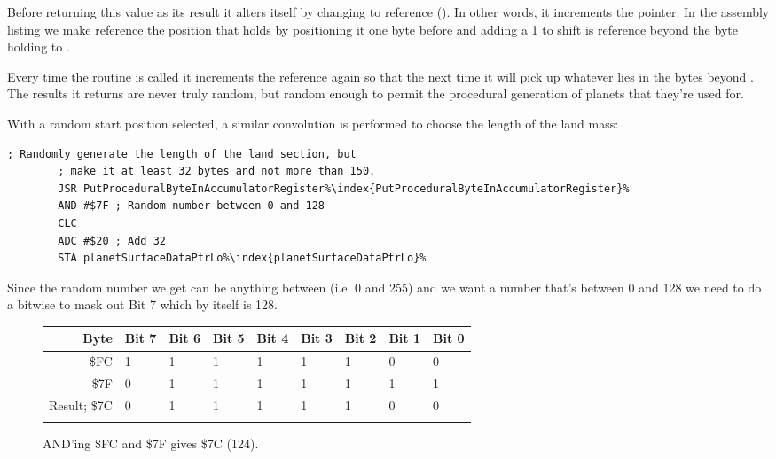 \begin{definition}
Before returning this value as its result it alters itself by changing
 to reference  (). In other words, it increments the pointer. In the
assembly listing we make  reference the position
that holds  by positioning it one byte before and
adding a 1 to shift is reference beyond the byte holding  to
.

Every time the routine is called it increments the reference again so that the next time it will pick up whatever
  lies in the bytes beyond . The results it returns are never truly random, but random enough
  to permit the procedural generation of planets that they're used for.

\end{definition}

With a random start position selected, a similar convolution is performed to choose the length of the land mass:

\begin{lstlisting}[caption=A convolution.,escapechar=\%]
        ; Randomly generate the length of the land section, but
        ; make it at least 32 bytes and not more than 150.
        JSR PutProceduralByteInAccumulatorRegister%\index{PutProceduralByteInAccumulatorRegister}%
        AND #$7F ; Random number between 0 and 128
        CLC
        ADC #$20 ; Add 32
        STA planetSurfaceDataPtrLo%\index{planetSurfaceDataPtrLo}%

\end{lstlisting}

Since the random number we get can be anything between  (i.e. 0 and 255) and we want a number
that's between 0 and 128 we need to do a bitwise  to mask out Bit 7 which by itself is 128.

\begin{figure}[H]
  {
    \setlength{\tabcolsep}{3.0pt}
    \setlength\cmidrulewidth{\heavyrulewidth} %
    \begin{adjustbox}{width=10cm,center}

      \begin{tabular}{rllllllll}
        \toprule
        Byte & Bit 7 & Bit 6 & Bit 5 & Bit 4 & Bit 3 & Bit 2 & Bit 1 & Bit 0        \\
        \midrule
        \$FC & 1 & 1 & 1 & 1 & 1 & 1 & 0 & 0 \\
        \$7F & 0 & 1 & 1 & 1 & 1 & 1 & 1 & 1 \\
        \midrule
        Result; \$7C & 0 & 1 & 1 & 1 & 1 & 1 & 0 & 0 \\
        \addlinespace
        \bottomrule
      \end{tabular}

    \end{adjustbox}

  }\caption*{AND'ing \$FC and \$7F gives \$7C (124).}
\end{figure}

